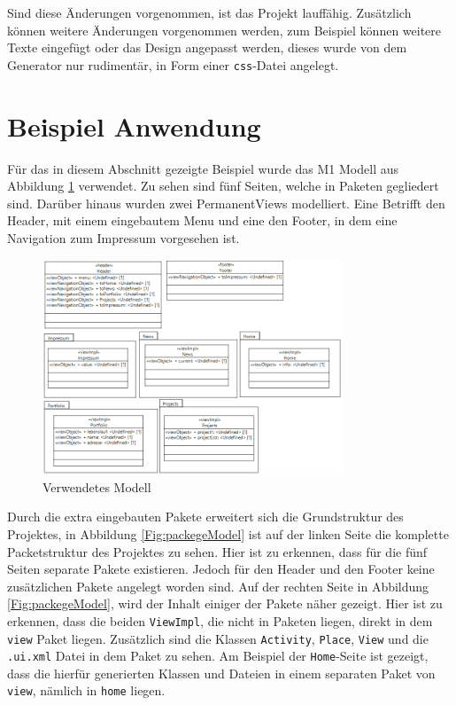 Sind diese Änderungen vorgenommen, ist das Projekt lauffähig. Zusätzlich können
weitere Änderungen vorgenommen werden, zum Beispiel können weitere Texte eingefügt
oder das Design angepasst werden, dieses wurde von dem Generator nur rudimentär,
in Form einer \texttt{css}-Datei angelegt.

\section{Beispiel Anwendung}
Für das in diesem Abschnitt gezeigte Beispiel wurde das M1 Modell aus Abbildung
\ref{Fig:ergModell} verwendet. Zu sehen sind fünf Seiten, welche in Paketen
gegliedert sind. Darüber hinaus wurden zwei PermanentViews modelliert. Eine
Betrifft den Header, mit einem eingebautem Menu und eine den Footer, in dem
eine Navigation zum Impressum vorgesehen ist.

\begin{figure}[htbp]
\begin{center}
\includegraphics[width=0.8\textwidth]{./img/Model2.png}
\caption{Verwendetes Modell}\label{Fig:ergModell}
\end{center}
\end{figure}

Durch die extra eingebauten Pakete erweitert sich die Grundstruktur des
Projektes, in Abbildung \ref{Fig:packegeModel} ist auf der linken Seite die
komplette Packetstruktur des Projektes zu sehen. Hier ist zu erkennen, dass
für die fünf Seiten separate Pakete existieren. Jedoch für den Header und den
Footer keine zusätzlichen Pakete angelegt worden sind. Auf der rechten Seite in
Abbildung \ref{Fig:packegeModel}, wird der Inhalt einiger der Pakete näher
gezeigt. Hier ist zu erkennen, dass die beiden \texttt{ViewImpl}, die nicht in
Paketen liegen, direkt in dem \texttt{view} Paket liegen. Zusätzlich sind die
Klassen \texttt{Activity}, \texttt{Place}, \texttt{View} und die
\texttt{.ui.xml} Datei in dem Paket zu sehen. Am Beispiel der
\texttt{Home}-Seite ist gezeigt, dass die hierfür generierten Klassen und
Dateien in einem separaten Paket von \texttt{view}, nämlich in \texttt{home}
liegen.

